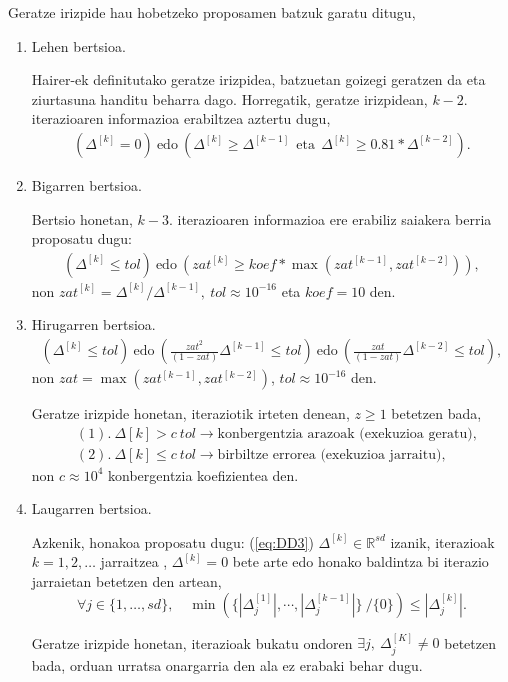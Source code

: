 Geratze irizpide hau hobetzeko proposamen batzuk garatu ditugu,
\begin{enumerate}
\item Lehen bertsioa.

Hairer-ek definitutako geratze irizpidea, batzuetan goizegi geratzen da eta ziurtasuna handitu beharra dago.  Horregatik, geratze irizpidean, $k-2.$ iterazioaren informazioa erabiltzea aztertu dugu, 
\begin{align*}
(\Delta^{[k]} = 0) \ \text{edo} \ ( \Delta^{[k]}\geqslant \Delta^{[k-1]} \ \ \text{eta} \ \ \Delta^{[k]}\geqslant 0.81*\Delta^{[k-2]}).
\end{align*}

\item Bigarren bertsioa.

Bertsio honetan, $k-3.$ iterazioaren informazioa ere erabiliz saiakera berria proposatu dugu:
\begin{align*}
\left(\Delta^{[k]} \leqslant tol \right) \ \text{edo} \ \left( zat^{[k]} \geqslant koef*\max(zat^{[k-1]},zat^{[k-2]}) \right),
\end{align*}
non $zat^{[k]}={\Delta^{[k]}}/{\Delta^{[k-1]}}, \ tol\approx10^{-16}$ eta $koef=10$ den.

\item Hirugarren bertsioa.
\begin{align*}
\left(\Delta^{[k]} \leqslant tol\right) \ \text{edo} \ \left(\frac{zat^2}{(1-zat)} \Delta^{[k-1]} \leqslant tol\right) \ \text{edo} \ \left(\frac{zat}{(1-zat)}\Delta^{[k-2]} \leqslant tol\right),
\end{align*}
non $zat=\max(zat^{[k-1]},zat^{[k-2]})$, $tol\approx10^{-16}$ den.

Geratze irizpide honetan, iteraziotik irteten denean, $z\geqslant1$ betetzen bada,
\begin{align*}
&(1). \ \Delta {[k]} > c \ tol \rightarrow \text{konbergentzia arazoak (exekuzioa geratu)},\\
&(2). \ \Delta {[k]} \leqslant c \ tol \rightarrow \text{birbiltze errorea (exekuzioa jarraitu)},
\end{align*}   
non $c\approx 10^{4}$ konbergentzia koefizientea den. 

\item Laugarren bertsioa.

Azkenik, honakoa proposatu dugu: (\ref{eq:DD3}) $\Delta ^{[k]} \in \mathbb{R}^{sd}$ izanik, iterazioak  $k=1,2,\ldots$ jarraitzea , $ \Delta^{[k]} =0$ bete arte edo honako baldintza bi iterazio jarraietan betetzen den artean,
\begin{equation*}
\forall j \in \{1,\ldots,s d\},  \quad
\min \left(\{|\Delta_j^{[1]}|,\cdots ,|\Delta_j^{[k-1]}|\} \ /\{0\} \right) \leqslant |\Delta_j^{[k]}|.
\end{equation*}

Geratze irizpide honetan, iterazioak bukatu ondoren $\exists j,  \ \Delta_{j}^{[K]} \neq 0$ betetzen bada, orduan urratsa onargarria den ala ez erabaki behar dugu. 


\end{enumerate}

